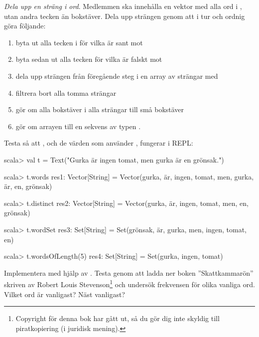 \begin{figure}[H]
\end{figure}

\Task \emph{Dela upp en sträng i ord}. Medlemmen  ska innehålla en vektor med alla ord i , utan andra tecken än bokstäver. 
Dela upp strängen  genom att i tur och ordnig göra följande:
\begin{enumerate}
\item byta ut alla tecken i  för vilka  är sant mot 
\item byta sedan ut alla tecken för vilka  är falskt mot  
\item dela upp strängen från föregående steg i en array av strängar med 
\item filtrera bort alla tomma strängar
\item gör om alla bokstäver i alla strängar till små bokstäver 
\item gör om arrayen till en sekvens av typen .
\end{enumerate}

\noindent Testa så att , och de värden som använder , fungerar i REPL:
\begin{REPL}
scala> val t = Text("Gurka är ingen tomat, men gurka är en grönsak.")

scala> t.words
res1: Vector[String] = 
  Vector(gurka, är, ingen, tomat, men, gurka, är, en, grönsak)

scala> t.distinct
res2: Vector[String] = 
  Vector(gurka, är, ingen, tomat, men, en, grönsak)

scala> t.wordSet
res3: Set[String] = Set(grönsak, är, gurka, men, ingen, tomat, en)

scala> t.wordsOfLength(5)
res4: Set[String] = Set(gurka, ingen, tomat)

\end{REPL}

\Task Implementera  med hjälp av . Testa  genom att ladda ner boken ''Skattkammarön'' skriven av Robert Louis Stevenson\footnote{Copyright för denna bok har gått ut, så du gör dig inte skyldig till piratkopiering (i juridisk mening).} och undersök frekvensen för olika vanliga ord. Vilket ord är vanligast? Näst vanligast?  

